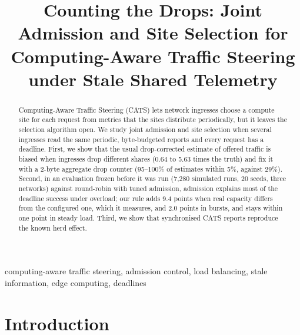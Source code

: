 \documentclass[conference]{IEEEtran}
\begin{document}
\title{Counting the Drops: Joint Admission and Site Selection for Computing-Aware Traffic Steering under Stale Shared Telemetry}

\author{
}

\maketitle

\begin{abstract}
Computing-Aware Traffic Steering (CATS) lets network ingresses choose a compute site for each request from metrics that the sites distribute periodically, but it leaves the selection algorithm open. We study joint admission and site selection when several ingresses read the same periodic, byte-budgeted reports and every request has a deadline. First, we show that the usual drop-corrected estimate of offered traffic is biased when ingresses drop different shares (0.64 to 5.63 times the truth) and fix it with a 2-byte aggregate drop counter (95--100\% of estimates within 5\%, against 29\%). Second, in an evaluation frozen before it was run (7,280 simulated runs, 20 seeds, three networks) against round-robin with tuned admission, admission explains most of the deadline success under overload; our rule adds 9.4 points when real capacity differs from the configured one, which it measures, and 2.0 points in bursts, and stays within one point in steady load. Third, we show that synchronised CATS reports reproduce the known herd effect.
\end{abstract}

\begin{IEEEkeywords}
computing-aware traffic steering, admission control, load balancing, stale information, edge computing, deadlines
\end{IEEEkeywords}

\section{Introduction}
\end{document}
